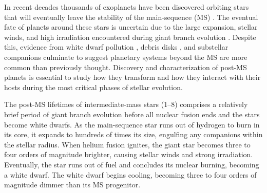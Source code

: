 \documentclass[twocolumn]{aastex631}
\begin{document}
In recent decades thousands of exoplanets have been discovered orbiting stars that will eventually leave the stability of the main-sequence (MS) \citep{akesonNASAExoplanetArchive2013}. The eventual fate of planets around these stars is uncertain due to the large expansion, stellar winds, and high irradiation encountered during giant branch evolution \citep{verasPostmainsequencePlanetarySystem2016}. Despite this, evidence from white dwarf pollution \citep{juraExternallyPollutedWhite2007,xuSpitzerObservationsWhite2012}, debris disks \citep{deruyterKeplerianDiscsPostAGB2006,zuckermanAncientPlanetarySystems2010,koesterFrequencyPlanetaryDebris2014}, and substellar companions \citep[e.g.,][]{luhmanDiscoveryCandidateCoolest2011,vanderburgGiantPlanetCandidate2020,blackmanJovianAnalogueOrbiting2021} culminate to suggest planetary systems beyond the MS are more common than previously thought. Discovery and characterization of post-MS planets is essential to study how they transform and how they interact with their hosts during the most critical phases of stellar evolution.

The post-MS lifetimes of intermediate-mass stars (\qtyrange{1}{8}{\solarmass}) comprises a relatively brief period of giant branch evolution before all nuclear fusion ends and the stars become white dwarfs. As the main-sequence star runs out of hydrogen to burn in its core, it expands to hundreds of times its size, engulfing any companions within the stellar radius. When helium fusion ignites, the giant star becomes three to four orders of magnitude brighter, causing stellar winds and strong irradiation. Eventually, the star runs out of fuel and concludes its nuclear burning, becoming a white dwarf. The white dwarf begins cooling, becoming three to four orders of magnitude dimmer than its MS progenitor.
\end{document}
